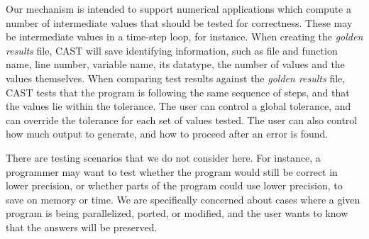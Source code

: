 Our mechanism is intended to support numerical applications which compute a number of intermediate values that should be tested for correctness.
These may be intermediate values in a time-step loop, for instance.
When creating the \emph{golden results} file, CAST will save identifying information, such as file and function name, line number, variable name, its datatype, the number of values and the values themselves.
When comparing test results against the \emph{golden results} file, CAST tests that the program is following the same sequence of steps, and that the values lie within the tolerance.
The user can control a global tolerance, and can override the tolerance for each set of values tested.
The user can also control how much output to generate, and how to proceed after an error is found.

There are testing scenarios that we do not consider here.
For instance, a programmer may want to test whether the program would still be correct in lower precision, or whether parts of the program could use lower precision, to save on memory or time.
We are specifically concerned about cases where a given program is being parallelized, ported, or modified, and the user wants to know that the answers will be preserved.

